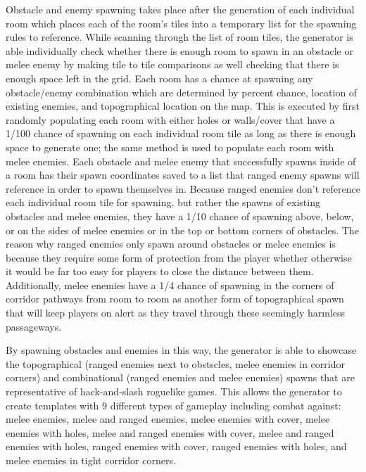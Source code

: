 \documentclass[10pt,twocolumn]{article}
\begin{document}
Obstacle and enemy spawning takes place after the generation of each individual room which places each of the room's tiles into a temporary list for the spawning rules to reference. While scanning through the list of room tiles, the generator is able individually check whether there is enough room to spawn in an obstacle or melee enemy by making tile to tile comparisons as well checking that there is enough space left in the grid. Each room has a chance at spawning any obstacle/enemy combination which are determined by percent chance, location of existing enemies, and topographical location on the map. This is executed by first randomly populating each room with either holes or walls/cover that have a 1/100 chance of spawning on each individual room tile as long as there is enough space to generate one; the same method is used to populate each room with melee enemies. Each obstacle and melee enemy that successfully spawns inside of a room has their spawn coordinates saved to a list that ranged enemy spawns will reference in order to spawn themselves in. Because ranged enemies don't reference each individual room tile for spawning, but rather the spawns of existing obstacles and melee enemies, they have a 1/10 chance of spawning above, below, or on the sides of melee enemies or in the top or bottom corners of obstacles. The reason why ranged enemies only spawn around obstacles or melee enemies is because they require some form of protection from the player whether otherwise it would be far too easy for players to close the distance between them. Additionally, melee enemies have a 1/4 chance of spawning in the corners of corridor pathways from room to room as another form of topographical spawn that will keep players on alert as they travel through these seemingly harmless passageways. 

By spawning obstacles and enemies in this way, the generator is able to showcase the topographical (ranged enemies next to obstscles, melee enemies in corridor corners) and combinational (ranged enemies and melee enemies) spawns that are representative of hack-and-slash roguelike games. This allows the generator to create templates with 9 different types of gameplay including combat against: melee enemies, melee and ranged enemies, melee enemies with cover, melee enemies with holes, melee and ranged enemies with cover, melee and ranged enemies with holes, ranged enemies with cover, ranged enemies with holes, and melee enemies in tight corridor corners. 
\end{document}
